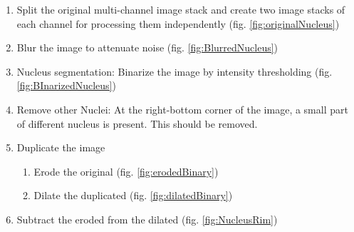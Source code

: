 \begin{enumerate}
  \item Split the original multi-channel image stack and create two image stacks of each channel for processing them independently (fig. \ref{fig:originalNucleus})
  \item Blur the image to attenuate noise (fig. \ref{fig:BlurredNucleus})
    \item Nucleus segmentation: Binarize the image by intensity thresholding  (fig. \ref{fig:BInarizedNucleus})
    \item Remove other Nuclei: At the right-bottom corner of the image, a small part of different nucleus is present. This should be removed. 
    \item Duplicate the image
    \begin{enumerate}
        \item Erode the original (fig. \ref{fig:erodedBinary})

        \item Dilate the duplicated (fig. \ref{fig:dilatedBinary})

    \end{enumerate}
    \item Subtract the eroded from the dilated (fig. \ref{fig:NucleusRim})

\end{enumerate}

